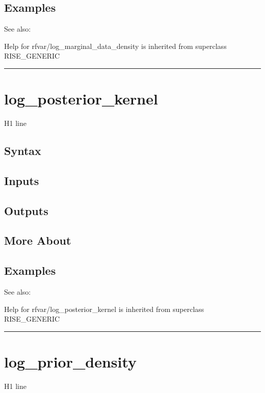\documentclass[letterpaper,10pt,english]{sphinxmanual}
\begin{document}
\subsection{Examples}
\label{classes/models/@rfvar/rfvar:id60}
See also:

Help for rfvar/log\_marginal\_data\_density is inherited from superclass RISE\_GENERIC


\bigskip\hrule{}\bigskip



\section{log\_posterior\_kernel}
\label{classes/models/@rfvar/rfvar:log-posterior-kernel}\label{classes/models/@rfvar/rfvar:id61}
H1 line


\subsection{Syntax}
\label{classes/models/@rfvar/rfvar:id62}

\subsection{Inputs}
\label{classes/models/@rfvar/rfvar:id63}

\subsection{Outputs}
\label{classes/models/@rfvar/rfvar:id64}

\subsection{More About}
\label{classes/models/@rfvar/rfvar:id65}

\subsection{Examples}
\label{classes/models/@rfvar/rfvar:id66}
See also:

Help for rfvar/log\_posterior\_kernel is inherited from superclass RISE\_GENERIC


\bigskip\hrule{}\bigskip



\section{log\_prior\_density}
\label{classes/models/@rfvar/rfvar:id67}\label{classes/models/@rfvar/rfvar:log-prior-density}
H1 line
\end{document}
